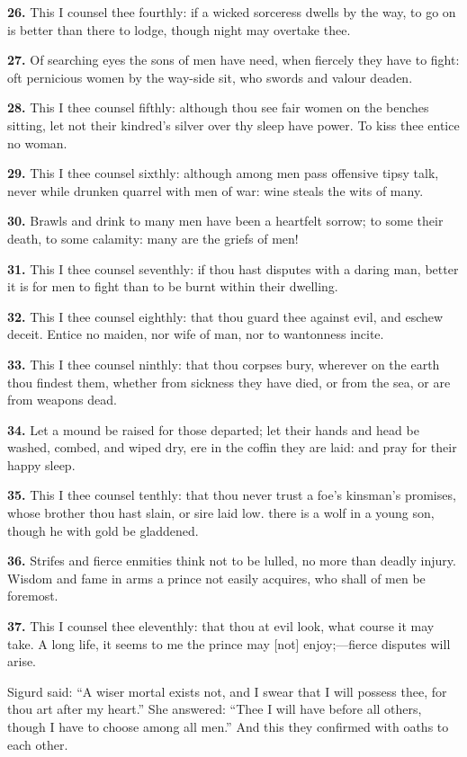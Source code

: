 \textbf{26.} This I counsel thee fourthly: if a wicked sorceress dwells by
the way, to go on is better than there to lodge, though night may
overtake thee.

\textbf{27.} Of searching eyes the sons of men have need, when fiercely they
have to fight: oft pernicious women by the way-side sit, who swords
and valour deaden.

\textbf{28.} This I thee counsel fifthly: although thou see fair women on the
benches sitting, let not their kindred's silver over thy sleep have
power. To kiss thee entice no woman.

\textbf{29.} This I thee counsel sixthly: although among men pass offensive
tipsy talk, never while drunken quarrel with men of war: wine steals
the wits of many.

\textbf{30.} Brawls and drink to many men have been a heartfelt sorrow; to
some their death, to some calamity: many are the griefs of men!

\textbf{31.} This I thee counsel seventhly: if thou hast disputes with a
daring man, better it is for men to fight than to be burnt within
their dwelling.

\textbf{32.} This I thee counsel eighthly: that thou guard thee against evil,
and eschew deceit. Entice no maiden, nor wife of man, nor to
wantonness incite.

\textbf{33.} This I thee counsel ninthly: that thou corpses bury, wherever on
the earth thou findest them, whether from sickness they have died, or
from the sea, or are from weapons dead.

\textbf{34.} Let a mound be raised for those departed; let their hands and
head be washed, combed, and wiped dry, ere in the coffin they are
laid: and pray for their happy sleep.

\textbf{35.} This I thee counsel tenthly: that thou never trust a foe's
kinsman's promises, whose brother thou hast slain, or sire laid low.
there is a wolf in a young son, though he with gold be gladdened.

\textbf{36.} Strifes and fierce enmities think not to be lulled, no more than
deadly injury. Wisdom and fame in arms a prince not easily acquires,
who shall of men be foremost.

\textbf{37.} This I counsel thee eleventhly: that thou at evil look, what
course it may take. A long life, it seems to me the prince may [not]
enjoy;—fierce disputes will arise.

Sigurd said: ``A wiser mortal exists not, and I swear that I will
possess thee, for thou art after my heart.'' She answered: ``Thee I will
have before all others, though I have to choose among all men.'' And
this they confirmed with oaths to each other.

